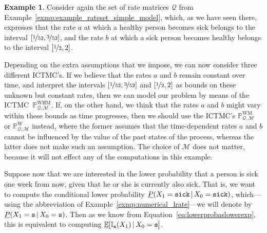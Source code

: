 \documentclass[10pt,a4paper]{paper}
\theoremstyle{definition}
\newtheorem{exmp}{Example}%
\newcommand{\ind}[1]{\mathbb{I}_{#1}}
\newcommand{\rateset}{\mathcal{Q}}
\newcommand{\ictmc}{{ICTMC}}
\begin{document}
\begin{exmp}\label{exmp:single_time_numerical}
Consider again the set of rate matrices $\rateset$ from Example~\ref{exmp:example_rateset_simple_model}, which, as we have seen there, expresses that the rate $a$ at which a healthy person becomes sick belongs to the interval $[\nicefrac{1}{52},\nicefrac{3}{52}]$, and the rate $b$ at which a sick person becomes healthy belongs to the interval $[\nicefrac{1}{2},2]$.

Depending on the extra assumptions that we impose, we can now consider three different \ictmc's. If we believe that the rates $a$ and $b$ remain constant over time, and interpret the intervals $[\nicefrac{1}{52},\nicefrac{3}{52}]$ and $[\nicefrac{1}{2},2]$ as bounds on these unknown but constant rates, then we can model our problem by means of the \ictmc~$\mathbb{P}_{\rateset,\mathcal{M}}^{\mathrm{WHM}}$. If, on the other hand, we think that the rates $a$ and $b$ might vary within these bounds as time progresses, then we should use the \ictmc's $\mathbb{P}_{\rateset,\mathcal{M}}^{\mathrm{WM}}$ or $\mathbb{P}_{\rateset,\mathcal{M}}^{\mathrm{W}}$ instead, where the former assumes that the time-dependent rates $a$ and $b$ cannot be influenced by the value of the past states of the process, whereas the latter does not make such an assumption. The choice of $\mathcal{M}$ does not matter, because it will not effect any of the computations in this example.

Suppose now that we are interested in the lower probability that a person is sick one week from now, given that he or she is currently also sick. That is, we want to compute the conditional lower probability $\underline{P}(X_1 = \text{{\tt sick}}\,\vert\,X_0=\text{{\tt sick}})$, which---using the abbreviation of Example~\ref{exmp:numerical_lrate}---we will denote by $\underline{P}(X_1 = \text{{\tt s}}\,\vert\,X_0=\text{{\tt s}})$. Then as we know from Equation~\eqref{eq:lowerprobaslowerexp}, this is equivalent to computing $\underline{\mathbb{E}}[\ind{\text{{\tt s}}}(X_1)\,\vert\,X_0=\text{{\tt s}}]$.


\end{exmp}
\end{document}
